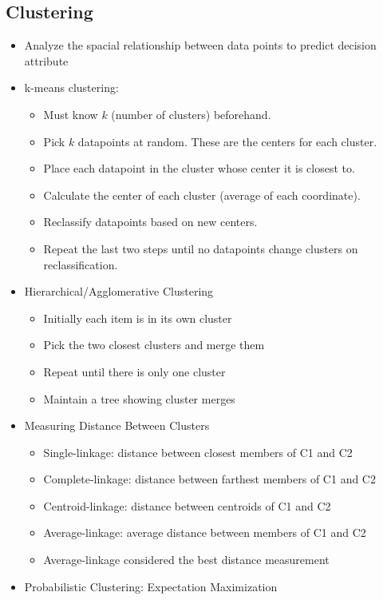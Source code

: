 \documentclass[fontsize=4pt]{scrartcl}
\begin{document}
\begin{multicols}{3}
\subsection{Clustering}
\begin{itemize}
	\item Analyze the spacial relationship between data points to predict decision attribute
	\item k-means clustering:
		\begin{itemize}
			\item Must know $k$ (number of clusters) beforehand.
			\item Pick $k$ datapoints at random. These are the centers for each cluster. 
			\item Place each datapoint in the cluster whose center it is closest to.
			\item Calculate the center of each cluster (average of each coordinate).
			\item Reclassify datapoints based on new centers.
			\item Repeat the last two steps until no datapoints change clusters on reclassification.
		\end{itemize}
	\item Hierarchical/Agglomerative Clustering
		\begin{itemize}
			\item Initially each item is in its own cluster
			\item Pick the two closest clusters and merge them 
			\item Repeat until there is only one cluster
			\item Maintain a tree showing cluster merges
		\end{itemize}
	\item Measuring Distance Between Clusters
		\begin{itemize}
			\item Single-linkage: distance between closest members of C1 and C2
			\item Complete-linkage: distance between farthest members of C1 and C2
			\item Centroid-linkage: distance between centroids of C1 and C2
			\item Average-linkage: average distance between members of C1 and C2
			\item Average-linkage considered the best distance measurement
		\end{itemize}
	\item Probabilistic Clustering: Expectation Maximization

\end{itemize}
\end{multicols}
\end{document}
